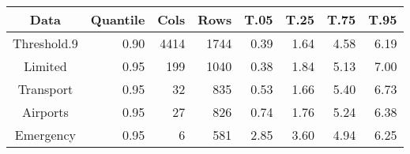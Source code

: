 \begin{tabular}{crrr|rrrr}
  \hline
Data & Quantile & Cols & Rows & T.05 & T.25 & T.75 & T.95 \\ 
  \hline
Threshold.9 & 0.90 & 4414 & 1744 & 0.39 & 1.64 & 4.58 & 6.19 \\ 
  Limited & 0.95 & 199 & 1040 & 0.38 & 1.84 & 5.13 & 7.00 \\ 
  Transport & 0.95 & 32 & 835 & 0.53 & 1.66 & 5.40 & 6.73 \\ 
  Airports & 0.95 & 27 & 826 & 0.74 & 1.76 & 5.24 & 6.38 \\ 
  Emergency & 0.95 & 6 & 581 & 2.85 & 3.60 & 4.94 & 6.25 \\ 
   \hline
\end{tabular}
